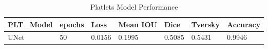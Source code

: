 \begin{table}
\centering
\begin{tabular}{|l|l|l|l|l|l|l|} 
\hline
\textbf{PLT\_Model} & \textbf{epochs} & \textbf{Loss}    & \textbf{Mean IOU} & \textbf{Dice}   & \textbf{Tversky} & \textbf{Accuracy}  \\ 
\hline
UNet       & 50 & 0.0156 & 0.1995   & 0.5085 & 0.5431  & 0.9946    \\
\hline
\end{tabular}
\caption{Platlets Model Performance}
\label{table:PLT_DOUNET_TRAIN}
\end{table}